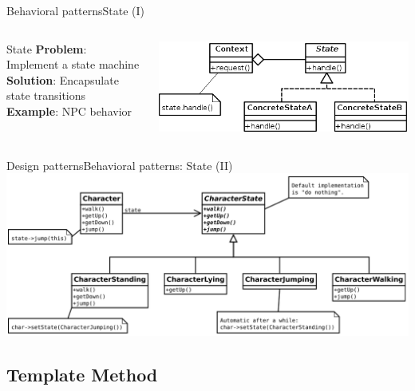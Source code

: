 \documentclass[10pt,compress]{beamer} %
\begin{document}
\begin{frame}{Behavioral patterns}{State (I)}
    \begin{columns}
	   \begin{block}{State}
			\textbf{Problem}: Implement a state machine\\
			\textbf{Solution}: Encapsulate state transitions\\
			\textbf{Example}: NPC behavior\\
		\end{block}
			\centering\includegraphics[width=\linewidth]{figs/state}\\
	\end{columns}
\end{frame}

\begin{frame}{Design patterns}{Behavioral patterns: State (II)}
			\centering\includegraphics[width=\linewidth]{figs/stategame}
\end{frame}

\subsection[Template Method]{Template Method}
\end{document}
